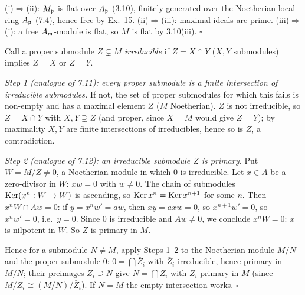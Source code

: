 \documentclass[11pt]{article}
\begin{document}
\pf
(i)$\Rightarrow$(ii): $M_\mathfrak p$ is flat over $A_\mathfrak p$ (3.10), finitely generated over the Noetherian local ring $A_\mathfrak p$ (7.4), hence free by Ex.~15.
(ii)$\Rightarrow$(iii): maximal ideals are prime.
(iii)$\Rightarrow$(i): a free $A_\mathfrak m$-module is flat, so $M$ is flat by 3.10(iii). \hfill$\square$

\pf
Call a proper submodule $Z\subsetneq M$ \emph{irreducible} if $Z=X\cap Y$ ($X,Y$ submodules) implies $Z=X$ or $Z=Y$.

\emph{Step 1 (analogue of 7.11): every proper submodule is a finite intersection of irreducible submodules.} If not, the set of proper submodules for which this fails is non-empty and has a maximal element $Z$ ($M$ Noetherian). $Z$ is not irreducible, so $Z=X\cap Y$ with $X,Y\supsetneq Z$ (and proper, since $X=M$ would give $Z=Y$); by maximality $X,Y$ are finite intersections of irreducibles, hence so is $Z$, a contradiction.

\emph{Step 2 (analogue of 7.12): an irreducible submodule $Z$ is primary.} Put $W=M/Z\ne0$, a Noetherian module in which $0$ is irreducible. Let $x\in A$ be a zero-divisor in $W$: $xw=0$ with $w\ne0$. The chain of submodules $\operatorname{Ker}(x^n:W\to W)$ is ascending, so $\operatorname{Ker} x^n=\operatorname{Ker} x^{n+1}$ for some $n$. Then $x^nW\cap Aw=0$: if $y=x^nw'=aw$, then $xy=axw=0$, so $x^{n+1}w'=0$, so $x^nw'=0$, i.e.\ $y=0$. Since $0$ is irreducible and $Aw\ne0$, we conclude $x^nW=0$: $x$ is nilpotent in $W$. So $Z$ is primary in $M$.

Hence for a submodule $N\ne M$, apply Steps 1--2 to the Noetherian module $M/N$ and the proper submodule $0$: $0=\bigcap\bar Z_i$ with $\bar Z_i$ irreducible, hence primary in $M/N$; their preimages $Z_i\supseteq N$ give $N=\bigcap Z_i$ with $Z_i$ primary in $M$ (since $M/Z_i\cong(M/N)/\bar Z_i$). If $N=M$ the empty intersection works. \hfill$\square$
\end{document}
